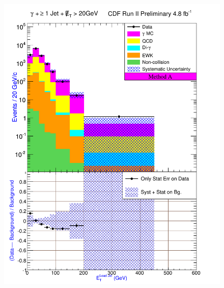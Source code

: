 \documentclass[12pt,twoside,letterpaper,doublespace]{article}
\begin{document}
\begin{figure}[h!]
{\includegraphics[keepaspectratio=true, scale=\figScale]{G30JetsMet20_MtdA_plot1_Et_j1.pdf}
}


\end{figure}
\end{document}
